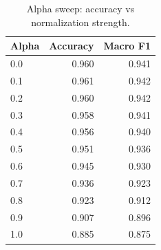 \begin{table}[htbp]
\centering
\small
\begin{tabular}{lrr}
\toprule
\textbf{Alpha} & \textbf{Accuracy} & \textbf{Macro F1} \\
\midrule
0.0 & 0.960 & 0.941 \\
0.1 & 0.961 & 0.942 \\
0.2 & 0.960 & 0.942 \\
0.3 & 0.958 & 0.941 \\
0.4 & 0.956 & 0.940 \\
0.5 & 0.951 & 0.936 \\
0.6 & 0.945 & 0.930 \\
0.7 & 0.936 & 0.923 \\
0.8 & 0.923 & 0.912 \\
0.9 & 0.907 & 0.896 \\
1.0 & 0.885 & 0.875 \\
\bottomrule
\end{tabular}
\caption{Alpha sweep: accuracy vs normalization strength.}
\label{tab:alpha-sweep}
\end{table}